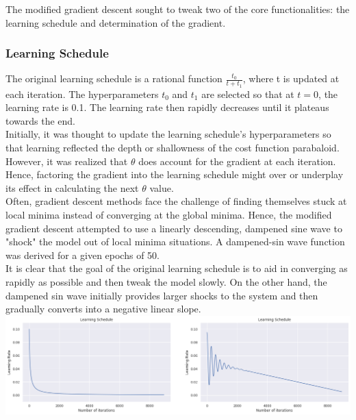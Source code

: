 \documentclass[onecolumn]{article}
\begin{document}
The modified gradient descent sought to tweak two of the core functionalities: the learning schedule and determination of the gradient.

\subsubsection{Learning Schedule}

The original learning schedule is a rational function $\frac{t_{0}}{t+t_{1}}$, where t is updated at each iteration. The hyperparameters $t_0$ and $t_1$ are selected so that at $t = 0$, the learning rate is 0.1. The learning rate then rapidly decreases until it plateaus towards the end. \\

Initially, it was thought to update the learning schedule's hyperparameters so that learning reflected the depth or shallowness of the cost function parabaloid. However, it was realized that $\theta$ does account for the gradient at each iteration. Hence, factoring the gradient into the learning schedule might over or underplay its effect in calculating the next $\theta$ value. \\

Often, gradient descent methods face the challenge of finding themselves stuck at local minima instead of converging at the global minima. Hence, the modified gradient descent attempted to use a linearly descending, dampened sine wave to "shock" the model out of local minima situations. A dampened-sin wave function was derived for a given epochs of 50. \\

It is clear that the goal of the original learning schedule is to aid in converging as rapidly as possible and then tweak the model slowly. On the other hand, the dampened sin wave initially provides larger shocks to the system and then gradually converts into a negative linear slope.\\

\begingroup
    \centering
    \medskip
    \includegraphics[width=\columnwidth]{Tex/mp1_images/schedule.png}
    \medskip
\endgroup
\medskip
\end{document}
